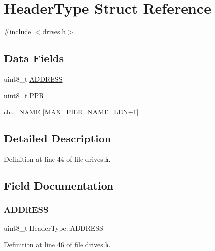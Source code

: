 \hypertarget{structHeaderType}{}\section{Header\+Type Struct Reference}
\label{structHeaderType}


{\ttfamily \#include $<$drives.\+h$>$}

\subsection*{Data Fields}
\begin{DoxyCompactItemize}
\item 
uint8\+\_\+t \hyperlink{structHeaderType_a70edfd477c537b2fa51c1aa63fcc7bee}{A\+D\+D\+R\+E\+SS}
\item 
uint8\+\_\+t \hyperlink{structHeaderType_ac642cdad0f3874495afa0ab687a56fd0}{P\+PR}
\item 
char \hyperlink{structHeaderType_aac997fd2dc536b10072137ecaf1fd0b4}{N\+A\+ME} \mbox{[}\hyperlink{drives_8h_a835262f9c26026aab5f91a528f57ad8f}{M\+A\+X\+\_\+\+F\+I\+L\+E\+\_\+\+N\+A\+M\+E\+\_\+\+L\+EN}+1\mbox{]}
\end{DoxyCompactItemize}


\subsection{Detailed Description}


Definition at line 44 of file drives.\+h.



\subsection{Field Documentation}
\mbox{\label{structHeaderType_a70edfd477c537b2fa51c1aa63fcc7bee}} 
\subsubsection{\texorpdfstring{A\+D\+D\+R\+E\+SS}{ADDRESS}}
{\footnotesize\ttfamily uint8\+\_\+t Header\+Type\+::\+A\+D\+D\+R\+E\+SS}



Definition at line 46 of file drives.\+h.



